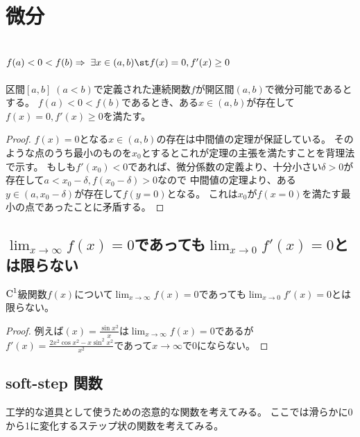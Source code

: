 \chapter{微分}
    \section{\texorpdfstring{$f(a)<0<f(b) \Rightarrow \;\exists x \in (a,b) \st f(x)=0, f'(x)\geq 0$}{f(a)<0<f(b) ⇔ ∃x∈(a,b) s.t. f(x)=0, f'(x)≦0}}
        \begin{shadebox}
            区間$[a,b]\;(a<b)$で定義された連続関数$f$が開区間$(a,b)$で微分可能であるとする。
            $f(a)<0<f(b)$であるとき、ある$x\in(a,b)$が存在して$f(x)=0, f'(x)\geq 0$を満たす。
        \end{shadebox}
    \begin{proof}
        \quad\par
        $f(x)=0$となる$x\in(a,b)$の存在は中間値の定理が保証している。
        そのような点のうち最小のものを$x_0$とするとこれが定理の主張を満たすことを背理法で示す。
        もしも$f'(x_0)<0$であれば、微分係数の定義より、十分小さい$\delta>0$が存在して$a<x_0-\delta, f(x_0-\delta)>0$なので
        中間値の定理より、ある$y\in(a,x_0-\delta)$が存在して$f(y=0)$となる。
        これは$x_0$が$f(x=0)$を満たす最小の点であったことに矛盾する。
    \end{proof}
    \section{\texorpdfstring{$\lim_{x\to\infty}{f(x)}=0$}{lim\_\{x→∞\}f(x)=0}であっても\texorpdfstring{$\displaystyle \lim_{x\to0}{f'(x)} = 0$}{lim\_\{x→∞\}f'(x)=0}とは限らない}
        \begin{shadebox}
            $\textup{C}^1$級関数$f(x)$について$\displaystyle \lim_{x\to\infty}{f(x)}=0$であっても$\displaystyle \lim_{x\to0}{f'(x)} = 0$とは限らない。
        \end{shadebox}
        \begin{proof}
            \quad\par
            例えば$\displaystyle (x) = \frac{\sin{x^2}}{x}$は$\displaystyle \lim_{x\to\infty}{f(x)}=0$であるが$\displaystyle f'(x) = \frac{2x^2\cos{x^2} - x\sin^2{x^2}}{x^2}$であって$x\to\infty$で0にならない。
        \end{proof}
    \section{soft-step 関数}
        工学的な道具として使うための恣意的な関数を考えてみる。
        ここでは滑らかに0から1に変化するステップ状の関数を考えてみる。
